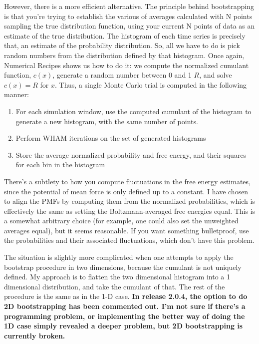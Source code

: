 \documentclass[12pt]{article}
\begin{document}
However, there is a more efficient alternative.  The principle behind
bootstrapping is that you're trying to establish the various of averages
calculated with N points sampling the true distribution function, using
your current N points of data as an estimate of the true distribution.
The histogram of each time series is precisely that, an estimate of the
probability distribution.  So, all we have to do is pick random numbers
from the distribution defined by that histogram.  Once again, Numerical
Recipes shows us how to do it: we compute the normalized cumulant function,
$c(x)$, generate a random number between 0 and 1 $R$, and solve $c(x) = R$ 
for $x$.  Thus, a single Monte Carlo trial is computed in the following manner:

\begin{enumerate}

\item For each simulation window, use the computed cumulant of the histogram
to generate a new histogram, with the same number of points.

\item Perform WHAM iterations on the set of generated histograms

\item Store the average normalized probability and free energy, and their
squares for each bin in the histogram 
\end{enumerate}

There's a subtlety to how you compute fluctuations in the free energy
estimates, since the potential of mean force is only defined up to a
constant.  I have chosen to align the PMFs by computing them from the
normalized probabilities, which is effectively the same as setting the
Boltzmann-averaged free energies equal.  This is a somewhat arbitrary choice
(for example, one could also set the unweighted averages equal), but it seems
reasonable.  If you want something bulletproof, use the probabilities and
their associated fluctuations, which don't have this problem.

The situation is slightly more complicated when one attempts to apply the
bootstrap procedure in two dimensions, because the cumulant is not uniquely
defined.  My approach is to flatten the two dimensional histogram into a 1
dimensional distribution, and take the cumulant of that.  The rest of the
procedure is the same as in the 1-D case.  {\bf In release 2.0.4, the option
to do 2D bootstrapping has been commented out.  I'm not sure if there's a
programming problem, or implementing the better way of doing the 1D case
simply revealed a deeper problem, but 2D bootstrapping is currently broken.}
\end{document}

